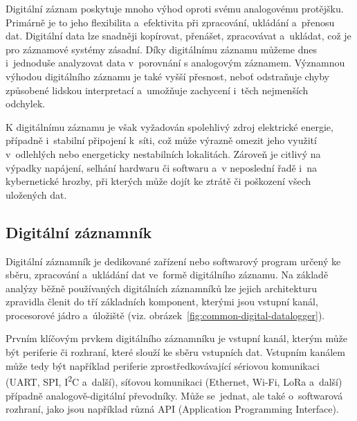 Digitální záznam poskytuje mnoho výhod oproti svému analogovému protějšku. Primárně je to jeho flexibilita a~efektivita při zpracování, ukládání a~přenosu dat. Digitální data lze snadněji kopírovat, přenášet, zpracovávat a~ukládat, což je pro záznamové systémy zásadní. Díky digitálnímu záznamu můžeme dnes i~jednoduše analyzovat data v~porovnání s analogovým záznamem.  Významnou výhodou digitálního záznamu je také vyšší přesnost, neboť odstraňuje chyby způsobené lidskou interpretací a~umožňuje zachycení i~těch nejmenších odchylek.~\cite{rcp_analog_vs_digital}

K digitálnímu záznamu je však vyžadován spolehlivý zdroj elektrické energie, případně i~stabilní připojení k~síti, což může výrazně omezit jeho využití v~odlehlých nebo energeticky nestabilních lokalitách. Zároveň je citlivý na výpadky napájení, selhání hardwaru či softwaru a~v neposlední řadě i~na kybernetické hrozby, při kterých může dojít ke ztrátě či poškození všech uložených dat.~\cite{rcp_analog_vs_digital}

\subsection{Digitální záznamník}
\label{digitalni_zaznamik}
Digitální záznamník je dedikované zařízení nebo softwarový program určený ke sběru, zpracování a~ukládání dat ve~formě digitálního záznamu. Na základě analýzy běžně používaných digitálních záznamníků lze jejich architekturu zpravidla členit do tří základních komponent, kterými jsou vstupní kanál, procesorové jádro a~úložiště (viz. obrázek~\ref{fig:common-digital-datalogger}).~\cite{researchgate_general_dataloggger_multiple_sdcards, ieee_digital_sound_recorder_arm_sd_card, ieee_multi_connectivity_datalogger_sd_card}

Prvním klíčovým prvkem digitálního záznamníku je vstupní kanál, kterým může být periferie či rozhraní, které slouží ke sběru vstupních dat. Vstupním kanálem může tedy být například periferie zprostředkovávající sériovou komunikaci (UART, SPI, I\textsuperscript{2}C a~další), síťovou komunikaci (Ethernet, Wi-Fi, LoRa a~další) případně analogově-digitální převodníky. Může se~jednat, ale také o~softwarová rozhraní, jako jsou například různá API (Application Programming Interface).~\cite{ researchgate_general_dataloggger_multiple_sdcards, ieee_digital_sound_recorder_arm_sd_card}

